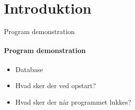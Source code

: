 \section{Introduktion}

\begin{frame}{Program demonstration}

	\framesubtitle{Program demonstration}
	
	\begin{itemize}
		\item Database 
		\item Hvad sker der ved opstart?
		\item Hvad sker der når programmet lukkes?
	\end{itemize}

	
\end{frame}